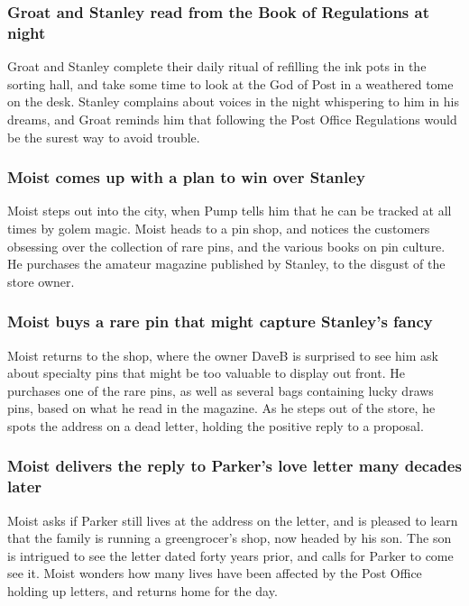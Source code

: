 \subsubsection{\Gls{Groat} and \Gls{Stanley} read from the Book of Regulations at night}
\Gls{Groat} and \Gls{Stanley} complete their daily ritual of refilling the ink pots in the sorting
hall, and take some time to look at the God of Post in a weathered tome on the desk. \Gls{Stanley}
complains about voices in the night whispering to him in his dreams, and \Gls{Groat} reminds him
that following the Post Office Regulations would be the surest way to avoid trouble.

\subsubsection{\Gls{Moist} comes up with a plan to win over \Gls{Stanley}}
\Gls{Moist} steps out into the city, when \Gls{Pump} tells him that he can be tracked at all times
by golem magic. \Gls{Moist} heads to a pin shop, and notices the customers obsessing over the
collection of rare pins, and the various books on pin culture. He purchases the amateur magazine
published by \Gls{Stanley}, to the disgust of the store owner.

\subsubsection{\Gls{Moist} buys a rare pin that might capture \Gls{Stanley}'s fancy}
\Gls{Moist} returns to the shop, where the owner \Gls{DaveB} is surprised to see him ask about
specialty pins that might be too valuable to display out front. He purchases one of the rare pins,
as well as several bags containing lucky draws pins, based on what he read in the magazine. As he
steps out of the store, he spots the address on a dead letter, holding the positive reply to a
proposal.

\subsubsection{\Gls{Moist} delivers the reply to \Gls{Parker}'s love letter many decades later}
\Gls{Moist} asks if \Gls{Parker} still lives at the address on the letter, and is pleased to learn
that the family is running a greengrocer's shop, now headed by his son. The son is intrigued to see
the letter dated forty years prior, and calls for \Gls{Parker} to come see it. \Gls{Moist} wonders
how many lives have been affected by the Post Office holding up letters, and returns home for the
day.

